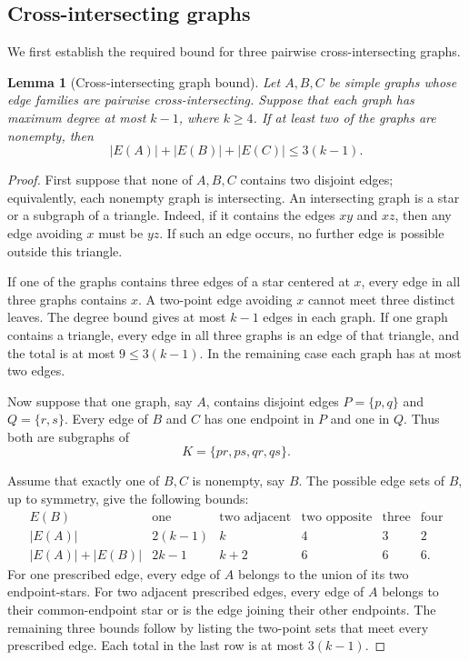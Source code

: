 \documentclass[11pt]{article}
\numberwithin{equation}{section}
\newtheorem{lemma}[lemma]{Lemma}
\theoremstyle{definition}
\theoremstyle{remark}
\begin{document}
\subsection{Cross-intersecting graphs}

We first establish the required bound for three pairwise cross-intersecting
graphs.

\begin{lemma}[Cross-intersecting graph bound]
\label{lem:triple-cross-graphs}
Let $A,B,C$ be simple graphs whose edge families are pairwise
cross-intersecting. Suppose that each graph has maximum degree at most
$k-1$, where $k\ge4$. If at least two of the graphs are nonempty, then
\[
 |E(A)|+|E(B)|+|E(C)|\le3(k-1).
\]
\end{lemma}

\begin{proof}
First suppose that none of $A,B,C$ contains two disjoint edges; equivalently,
each nonempty graph is intersecting. An intersecting graph is a star or a
subgraph of a triangle. Indeed, if it
contains the edges $xy$ and $xz$, then any edge avoiding $x$ must be $yz$.
If such an edge occurs, no further edge is possible outside this triangle.

If one of the graphs contains three edges of a star centered at $x$, every
edge in all three graphs contains $x$. A two-point edge avoiding $x$ cannot
meet three distinct leaves. The degree bound gives at most $k-1$ edges in
each graph. If one graph contains a triangle, every edge in all three graphs
is an edge of that triangle, and the total is at most $9\le3(k-1)$. In the
remaining case each graph has at most two edges.

Now suppose that one graph, say $A$, contains disjoint edges
$P=\{p,q\}$ and $Q=\{r,s\}$. Every edge of $B$ and $C$ has one endpoint in
$P$ and one in $Q$. Thus both are subgraphs of
\[
 K=\{pr,ps,qr,qs\}.
\]

Assume that exactly one of $B,C$ is nonempty, say $B$. The possible edge
sets of $B$, up to symmetry, give the following bounds:
\[
\begin{array}{c|ccccc}
E(B)&\text{one}&\text{two adjacent}&\text{two opposite}&\text{three}&\text{four}\\
\hline
|E(A)|&2(k-1)&k&4&3&2\\
|E(A)|+|E(B)|&2k-1&k+2&6&6&6.
\end{array}
\]
For one prescribed edge, every edge of $A$ belongs to the union of its two
endpoint-stars. For two adjacent prescribed edges, every edge of $A$ belongs
to their common-endpoint star or is the edge joining their other endpoints.
The remaining three bounds follow by listing the two-point sets that meet
every prescribed edge. Each total in the last row is at most $3(k-1)$.


\end{proof}
\end{document}
